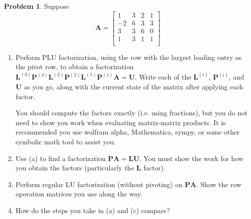 \documentclass[12pt]{article}
\theoremstyle{definition}
\newtheorem{problem}{Problem}
\renewcommand{\vec}{\mathbf}
\begin{document}
\begin{problem}
Suppose
    \[
        \vec{A} 
        = 
        \begin{bmatrix}
            1 & 3 & 2 & 1 \\
            -2 & 6 & 3 & 3 \\
            3 & 3 & 6 & 0 \\
            1 & 3 & 1 & 1 \\
        \end{bmatrix}
    \]

    \begin{enumerate}
        \item Perform PLU factorization, using the row with the largest leading entry as the pivot row, to obtain a factorization $\vec{L}^{(3)} \vec{P}^{(3)} \vec{L}^{(2)} \vec{P}^{(2)} \vec{L}^{(1)} \vec{P}^{(1)} \vec{A} = \vec{U}$.
        Write each of the $\vec{L}^{(i)}$, $\vec{P}^{(i)}$, and $\vec{U}$ as you go, along with the current state of the matrix after applying each factor.
            
            You should compute the factors exactly (i.e. using fractions), but you do not need to show you work when evaluating matrix-matrix products. It is recommended you use wolfram alpha, Mathematica, sympy, or some other symbolic math tool to assist you.  

        \item Use (a) to find a factorization $\vec{P}\vec{A}  = \vec{L} \vec{U}$.
        You must show the work for how you obtain the factors (particularly the $\vec{L}$ factor).
        \item Perform regular LU factorization (without pivoting) on $\vec{P}\vec{A}$.
            Show the row operation matrices you use along the way.
        \item How do the steps you take in (a) and (c) compare?
    \end{enumerate}
\end{problem}
\end{document}
